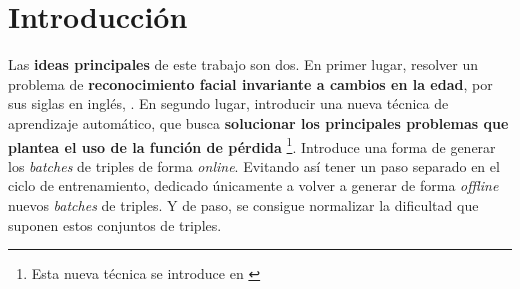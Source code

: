 
\chapter{Introducción}




Las \textbf{ideas principales} de este trabajo son dos. En primer lugar, resolver un problema de \textbf{reconocimiento facial invariante a cambios en la edad}, por sus siglas en inglés, . En segundo lugar, introducir una nueva técnica de aprendizaje automático, que busca \textbf{solucionar los principales problemas que plantea el uso de la función de pérdida } \footnote{Esta nueva técnica se introduce en \cite{matematicas:principal}}. Introduce una forma de generar los \textit{batches} de triples de forma \textit{online}. Evitando así tener un paso separado en el ciclo de entrenamiento, dedicado únicamente a volver a generar de forma \textit{offline} nuevos \textit{batches} de triples. Y de paso, se consigue normalizar la dificultad que suponen estos conjuntos de triples.

